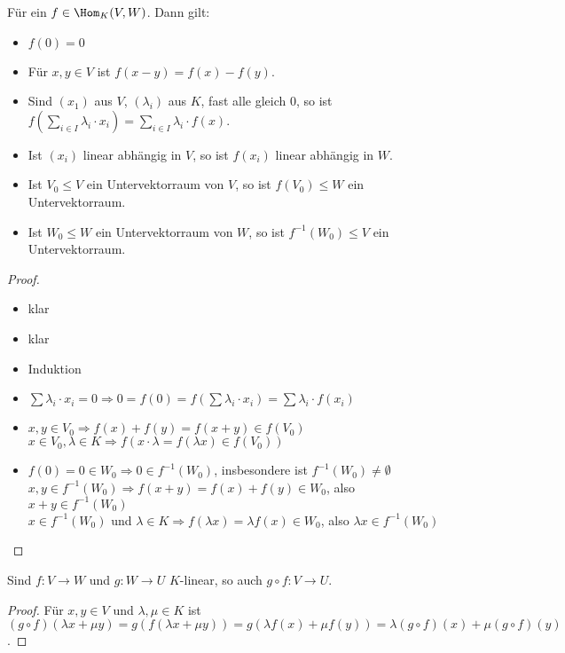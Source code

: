 \begin{proposition}
	Für ein $f\in \Hom_K(V,W)$. Dann gilt:
	\begin{itemize}
		\item $f(0)=0$
		\item Für $x,y\in V$ ist $f(x-y)=f(x)-f(y)$.
		\item Sind $(x_1)$ aus $V$, $(\lambda_i)$ aus $K$, fast alle gleich 0, so ist $f(\sum_{i\in I} \lambda_i
		\cdot x_i)=\sum_{i\in I} \lambda_i\cdot f(x)$.
		\item Ist $(x_i)$ linear abhängig in $V$, so ist $f(x_i)$ linear abhängig in $W$.
		\item Ist $V_0\le V$ ein Untervektorraum von $V$, so ist $f(V_0)\le W$ ein Untervektorraum.
		\item Ist $W_0\le W$ ein Untervektorraum von $W$, so ist $f^{-1}(W_0)\le V$ ein Untervektorraum.
	\end{itemize}
\end{proposition}
\begin{proof}
	\begin{itemize}
		\item klar
		\item klar
		\item Induktion
		\item $\sum \lambda_i\cdot x_i=0\Rightarrow 0=f(0)=f(\sum \lambda_i\cdot x_i)=\sum \lambda_i\cdot f(x_i)$
		\item $x,y\in V_0\Rightarrow f(x)+f(y)=f(x+y)\in f(V_0)$ \\ 
		$x\in V_0,\lambda\in K\Rightarrow f(x\cdot \lambda= f(\lambda x)\in f(V_0))$
		\item $f(0)=0\in W_0\Rightarrow 0\in f^{-1}(W_0)$, insbesondere ist $f^{-1}(W_0)\neq \emptyset$ \\ 
		$x,y\in f^{-1}(W_0)\Rightarrow f(x+y)=f(x)+f(y)\in W_0$, also $x+y\in f^{-1}(W_0)$ \\
		$x\in f^{-1}(W_0)$ und $\lambda\in K\Rightarrow f(\lambda x)=\lambda f(x)\in W_0$, also $\lambda x\in f^{-1}(W_0)$
	\end{itemize}
\end{proof}

\begin{proposition}
	Sind $f:V\to W$ und $g:W\to U$ $K$-linear, so auch $g\circ f: V\to U$.
\end{proposition}
\begin{proof}
	Für $x,y\in V$ und $\lambda,\mu\in K$ ist $(g\circ f)(\lambda x + \mu y)=g(f(\lambda x + \mu y))=g(\lambda f(x) + 
	\mu f(y))=\lambda (g\circ f)(x) + \mu (g\circ f)(y)$.
\end{proof}

